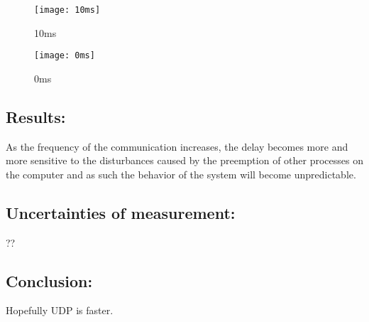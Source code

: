 \begin{figure}[H]

    \centering

    \texttt{[image: 10ms]}

    \caption{10ms}

\end{figure} 

\begin{figure}[H]

    \centering

    \texttt{[image: 0ms]}

    \caption{0ms}

\end{figure} 


\begin{figure}

\end{figure}

\subsection*{Results:}

As the frequency of the communication increases, the delay becomes more and more sensitive to the disturbances caused by the preemption of other processes on the computer and as such the behavior of the system will become unpredictable. 


\subsection*{Uncertainties of measurement:}

??

\subsection*{Conclusion:}

Hopefully UDP is faster.